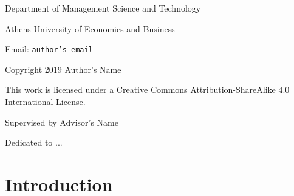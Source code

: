 




\begin{titlepage}

\end{titlepage}

\clearpage
\vspace*{\fill}
\begin{minipage}{.9\textwidth}
\centerline{Department of Management Science and Technology}
\centerline{Athens University of Economics and Business}
\centerline{Email: {\tt author's email}}
\vspace{1cm}
\centerline{Copyright 2019 Author's Name}
\centerline{This work is licensed under a Creative Commons Attribution-ShareAlike 4.0 International License.}
\end{minipage}
\vfill %
\clearpage

\clearpage
\vspace*{\fill}
\begin{minipage}{.9\textwidth}
\centerline{Supervised by Advisor's Name}
\end{minipage}
\vfill %
\clearpage

\clearpage
\vspace*{\fill}
\begin{minipage}{.9\textwidth}
\begin{flushright}
Dedicated to ...
\end{flushright}
\end{minipage}
\vfill %
\clearpage

\tableofcontents
\clearpage

\listoffigures
\clearpage

\listoftables
\clearpage




\clearpage

\pagestyle{fancy}
\fancyhf{}
\fancyhead[L]{\thepage\ / \pageref{LastPage}}
\fancyhead[R]{\it \rightmark}


\chapter{Introduction}
\label{ch:intro}

